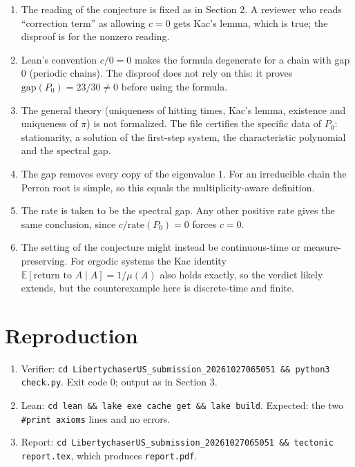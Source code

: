 \documentclass[11pt,a4paper]{article}
\begin{document}
\begin{enumerate}
\item The reading of the conjecture is fixed as in Section 2. A reviewer who reads ``correction term'' as allowing $c=0$ gets Kac's lemma, which is true; the disproof is for the nonzero reading.
\item Lean's convention $c/0=0$ makes the formula degenerate for a chain with gap $0$ (periodic chains). The disproof does not rely on this: it proves $\mathrm{gap}(P_0)=23/30\neq 0$ before using the formula.
\item The general theory (uniqueness of hitting times, Kac's lemma, existence and uniqueness of $\pi$) is not formalized. The file certifies the specific data of $P_0$: stationarity, a solution of the first-step system, the characteristic polynomial and the spectral gap.
\item The gap removes every copy of the eigenvalue $1$. For an irreducible chain the Perron root is simple, so this equals the multiplicity-aware definition.
\item The rate is taken to be the spectral gap. Any other positive rate gives the same conclusion, since $c/\mathrm{rate}(P_0)=0$ forces $c=0$.
\item The setting of the conjecture might instead be continuous-time or measure-preserving. For ergodic systems the Kac identity $\mathbb{E}[\text{return to }A\mid A]=1/\mu(A)$ also holds exactly, so the verdict likely extends, but the counterexample here is discrete-time and finite.
\end{enumerate}

\section{Reproduction}

\begin{enumerate}
\item Verifier: \texttt{cd LibertychaserUS\_submission\_20261027065051 \&\& python3 check.py}. Exit code 0; output as in Section 3.
\item Lean: \texttt{cd lean \&\& lake exe cache get \&\& lake build}. Expected: the two \texttt{\#print axioms} lines and no errors.
\item Report: \texttt{cd LibertychaserUS\_submission\_20261027065051 \&\& tectonic report.tex}, which produces \texttt{report.pdf}.
\end{enumerate}
\end{document}
